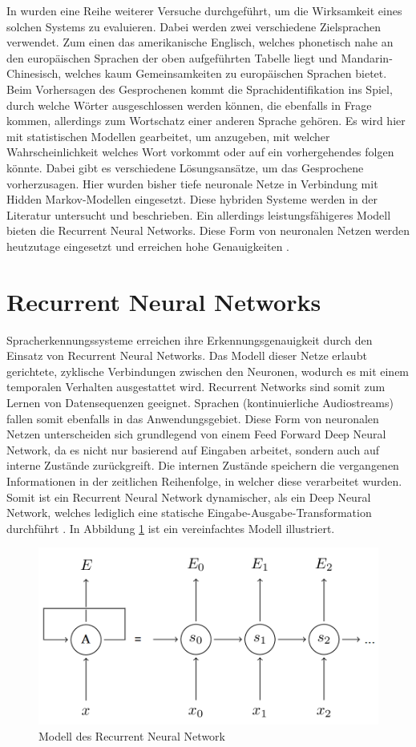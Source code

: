 In {\cite{6639081}} wurden eine Reihe weiterer Versuche durchgeführt, um die Wirksamkeit eines solchen Systems zu evaluieren. Dabei werden zwei verschiedene Zielsprachen verwendet. Zum einen das amerikanische Englisch, welches phonetisch nahe an den europäischen Sprachen der oben aufgeführten Tabelle liegt und Mandarin-Chinesisch, welches kaum Gemeinsamkeiten zu europäischen Sprachen bietet. Beim Vorhersagen des Gesprochenen kommt die Sprachidentifikation ins Spiel, durch welche Wörter ausgeschlossen werden können, die ebenfalls in Frage kommen, allerdings zum Wortschatz einer anderen Sprache gehören. Es wird hier mit statistischen Modellen gearbeitet, um anzugeben, mit welcher Wahrscheinlichkeit welches Wort vorkommt oder auf ein vorhergehendes folgen könnte. Dabei gibt es verschiedene Lösungsansätze, um das Gesprochene vorherzusagen. Hier wurden bisher tiefe neuronale Netze in Verbindung mit Hidden Markov-Modellen eingesetzt. Diese hybriden Systeme werden in der Literatur untersucht und beschrieben. Ein allerdings leistungsfähigeres Modell bieten die Recurrent Neural Networks. Diese Form von neuronalen Netzen werden heutzutage eingesetzt und erreichen hohe Genauigkeiten {\cite{Yu.2014}}.


\section{Recurrent Neural Networks}
Spracherkennungssysteme erreichen ihre Erkennungsgenauigkeit durch den Einsatz von Recurrent Neural Networks. 
Das Modell dieser Netze erlaubt gerichtete, zyklische Verbindungen zwischen den Neuronen, wodurch es mit einem temporalen Verhalten ausgestattet wird. Recurrent Networks sind somit zum Lernen von Datensequenzen geeignet. Sprachen (kontinuierliche Audiostreams) fallen somit ebenfalls in das Anwendungsgebiet. Diese Form von neuronalen Netzen unterscheiden sich grundlegend von einem Feed Forward Deep Neural Network, da es nicht nur basierend auf Eingaben arbeitet, sondern auch auf interne Zustände zurückgreift. Die internen Zustände speichern die vergangenen Informationen in der zeitlichen Reihenfolge, in welcher diese verarbeitet wurden. Somit ist ein Recurrent Neural Network dynamischer, als ein Deep Neural Network, welches lediglich eine statische Eingabe-Ausgabe-Transformation durchführt \cite{Yu.2014}. In Abbildung \ref{fig:rnn} ist ein vereinfachtes Modell illustriert.

\begin{figure}[H]
	\centering
	\includegraphics[width=0.8\linewidth]{images/rnn}
	\caption{Modell des Recurrent Neural Network  \cite{GonzalezDominguez.2015}} %
	\label{fig:rnn}
\end{figure}

